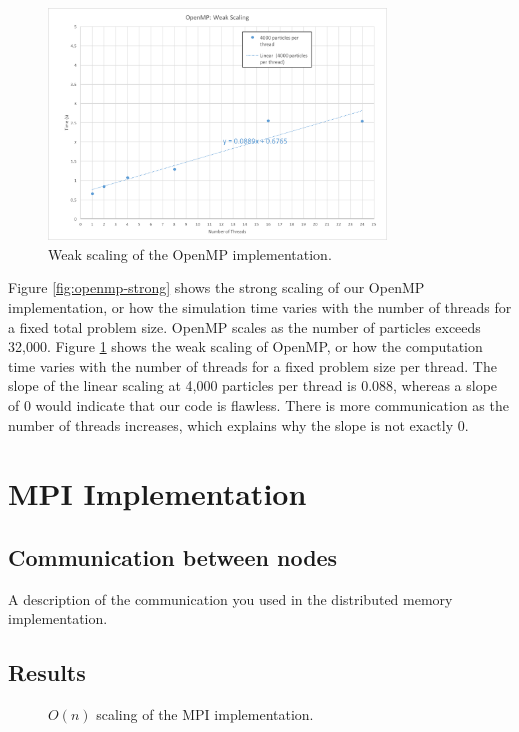 \documentclass[12pt]{article}
\begin{document}
\begin{figure}
	\centering
\includegraphics[width=0.8\textwidth]{graphs/weak_scaling.png}
  \caption{Weak scaling of the OpenMP implementation.}
  \label{fig:openmp-weak}
\end{figure}

Figure \ref{fig:openmp-strong} shows the strong scaling of our OpenMP implementation, or how the simulation time varies with the number of threads for a fixed total problem size. OpenMP scales as the number of particles exceeds 32,000. Figure \ref{fig:openmp-weak} shows the weak scaling of OpenMP, or how the computation time varies with the number of threads for a fixed problem size per thread. The slope of the linear scaling at 4,000 particles per thread is 0.088, whereas a slope of 0 would indicate that our code is flawless. There is more communication as the number of threads increases, which explains why the slope is not exactly 0.

\section{MPI Implementation}

\subsection{Communication between nodes}
A description of the communication you used in the distributed memory implementation.

\subsection{Results}

\begin{figure}
  \caption{$O(n)$ scaling of the MPI implementation.}
  \label{fig:mpi-on}
\end{figure}
\end{document}
